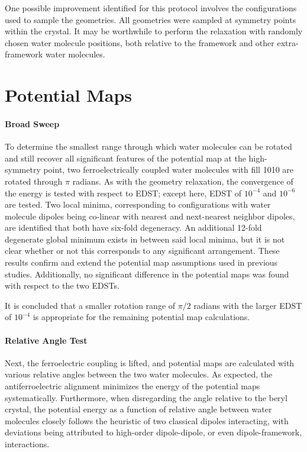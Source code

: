 One possible improvement identified for this protocol involves the configurations used to sample the geometries. All geometries were sampled at symmetry points within the crystal. It may be worthwhile to perform the relaxation with randomly chosen water molecule positions, both relative to the framework and other extra-framework water molecules.

\section{Potential Maps}

\paragraph{Broad Sweep} To determine the smallest range through which water molecules can be rotated and still recover all significant features of the potential map at the high-symmetry point, two ferroelectrically coupled water molecules with fill 1010 are rotated through $\pi$ radians. As with the geometry relaxation, the convergence of the energy is tested with respect to EDST; except here, EDST of $10^{-4}$ and $10^{-6}$ are tested. Two local minima, corresponding to configurations with water molecule dipoles being co-linear with nearest and next-nearest neighbor dipoles, are identified that both have six-fold degeneracy. An additional 12-fold degenerate global minimum exists in between said local minima, but it is not clear whether or not this corresponds to any significant arrangement. These results confirm and extend the potential map assumptions used in previous studies. Additionally, no significant difference in the potential maps was found with respect to the two EDSTs.

It is concluded that a smaller rotation range of $\pi/2$ radians with the larger EDST of $10^{-4}$ is appropriate for the remaining potential map calculations.

\paragraph{Relative Angle Test} Next, the ferroelectric coupling is lifted, and potential maps are calculated with various relative angles between the two water molecules. As expected, the antiferroelectric alignment minimizes the energy of the potential maps systematically. Furthermore, when disregarding the angle relative to the beryl crystal, the potential energy as a function of relative angle between water molecules closely follows the heuristic of two classical dipoles interacting, with deviations being attributed to high-order dipole-dipole, or even dipole-framework, interactions. 

